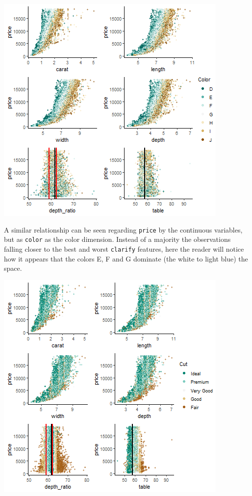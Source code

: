 \documentclass[
  paper=a4,
  ,captions=tableheading
]{scrartcl}
\begin{document}
\begin{center}\includegraphics{Diamonds_PDF_files/figure-latex/Price by X and Color-1} \end{center}

A similar relationship can be seen regarding \texttt{price} by the
continuous variables, but as \texttt{color} as the color dimension.
Instead of a majority the observations falling closer to the best and
worst \texttt{clarify} features, here the reader will notice how it
appears that the colors E, F and G dominate (the white to light blue)
the space.

\begin{center}\includegraphics{Diamonds_PDF_files/figure-latex/Price by X and Cut-1} \end{center}
\end{document}
